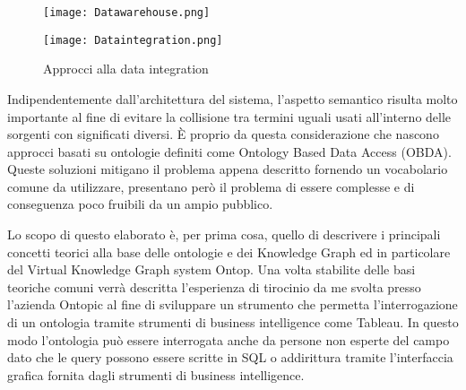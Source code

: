 \begin{figure}[ht]
    \centering
    \begin{minipage}{0.45\linewidth}
        \centering
        \texttt{[image: Datawarehouse.png]}
    \end{minipage}
    \begin{minipage}{0.45\linewidth}
        \centering
        \texttt{[image: Dataintegration.png]}
    \end{minipage}
    \caption{Approcci alla data integration \cite{DataIntegrationImg}}
    \label{fig:dataIntegration}
\end{figure}
Indipendentemente dall'architettura del sistema, l'aspetto semantico risulta molto importante al fine di evitare la collisione tra termini uguali usati all'interno delle sorgenti con significati
diversi. \`E proprio da questa considerazione che nascono approcci basati su ontologie definiti come Ontology Based Data Access (OBDA). Queste soluzioni mitigano il problema appena descritto fornendo un vocabolario 
comune da utilizzare, presentano però il problema di essere complesse e di conseguenza poco fruibili da un ampio pubblico.

Lo scopo di questo elaborato è, per prima cosa, quello di descrivere i principali concetti teorici alla base delle ontologie e dei Knowledge Graph ed in particolare del Virtual Knowledge Graph system Ontop. Una volta stabilite delle
basi teoriche comuni verrà descritta l'esperienza di tirocinio da me svolta presso l'azienda Ontopic al fine di sviluppare un strumento che permetta l'interrogazione di un ontologia tramite strumenti di business intelligence 
come Tableau. In questo modo l'ontologia può essere interrogata anche da persone non esperte del campo dato che le query possono essere scritte in SQL o addirittura tramite l'interfaccia grafica fornita dagli strumenti di 
business intelligence.